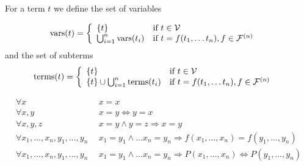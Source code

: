 
\begin{definition}For a term $t$ we define the set of variables
	
	\begin{align*}
		\operatorname{vars}(t) &= \left\{\begin{array}{ll}
			\{ t \} & \text{if } t \in {\mathcal V} \\
			\bigcup_{i=1}^n \operatorname{vars}(t_i) & \text{if }  t = f(t_1, \ldots t_n), f \in {\mathcal F}^{(n)}
		\end{array}\right.	
	\end{align*}
	and the set of subterms
	\begin{align*}
	\operatorname{terms}(t) &= \left\{\begin{array}{ll}
	\{ t \} & \text{if } t \in {\mathcal V} \\
	\{ t \} \cup \bigcup_{i=1}^n \operatorname{terms}(t_i) & \text{if }  t = f(t_1, \ldots t_n), f \in {\mathcal F}^{(n)}
	\end{array}\right.	
	\end{align*}
	
\end{definition}


	\begin{align*}
	\forall x\ &\ x = x \\
	\forall x,y\ &\ x = y \Leftrightarrow y = x \\
	\forall x,y,z\ &\ x = y \land y = z \Rightarrow x = y \\
	\forall x_1,\ldots,x_n,y_1,\ldots,y_n\ &\ x_1=y_1\land\ldots x_n=y_n\Rightarrow f(x_1,\ldots,x_n)=f(y_1,\ldots,y_n) \\
	\forall x_1,\ldots,x_n,y_1,\ldots,y_n\ &\ x_1=y_1\land\ldots x_n=y_n\Rightarrow P(x_1,\ldots,x_n)\Leftrightarrow P(y_1,\ldots,y_n) \\
	\end{align*}

